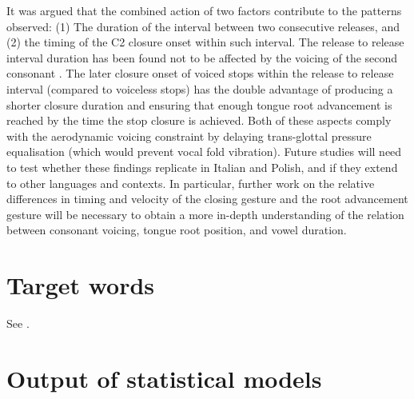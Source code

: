 \documentclass[12pt,]{article}
\begin{document}
It was argued that the combined action of two factors contribute to the
patterns observed: (1) The duration of the interval between two
consecutive releases, and (2) the timing of the C2 closure onset within
such interval. The release to release interval duration has been found
not to be affected by the voicing of the second consonant
\citep{coretta2018j}. The later closure onset of voiced stops within the
release to release interval (compared to voiceless stops) has the double
advantage of producing a shorter closure duration and ensuring that
enough tongue root advancement is reached by the time the stop closure
is achieved. Both of these aspects comply with the aerodynamic voicing
constraint \citep{ohala2011} by delaying trans-glottal pressure
equalisation (which would prevent vocal fold vibration). Future studies
will need to test whether these findings replicate in Italian and
Polish, and if they extend to other languages and contexts. In
particular, further work on the relative differences in timing and
velocity of the closing gesture and the root advancement gesture will be
necessary to obtain a more in-depth understanding of the relation
between consonant voicing, tongue root position, and vowel duration.

\appendix

\hypertarget{target-words}{%
\section{Target words}\label{target-words}}

\label{a:targets}

See .


\hypertarget{output-of-statistical-models}{%
\section{Output of statistical
models}\label{output-of-statistical-models}}
\end{document}
